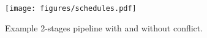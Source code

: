 \begin{figure}[h] 
\centering
\texttt{[image: figures/schedules.pdf]}
\caption{Example 2-stages pipeline with and without conflict.}
\label{fig:schedules}
\vspace{-10pt}
\end{figure}


